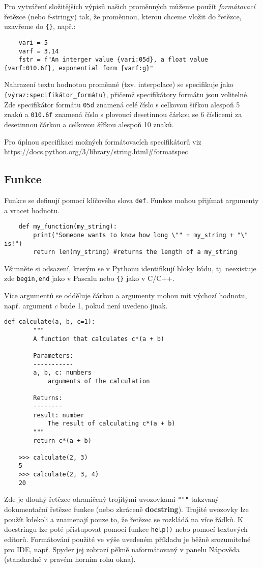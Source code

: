 Pro vytváření složitějších výpisů našich proměnných můžeme použít \emph{formátovací} řetězce (nebo f-stringy) tak, že proměnnou, kterou chceme vložit do řetězce, uzavřeme do \verb|{}|, např.:
\begin{lstlisting}
    vari = 5
    varf = 3.14
    fstr = f"An interger value {vari:05d}, a float value {varf:010.6f}, exponential form {varf:g}"
\end{lstlisting}
Nahrazení textu hodnotou proměnné (tzv. interpolace) se specifikuje jako \verb|{výraz:specifikátor_formátu}|, přičemž specifikátory formátu jsou volitelné. Zde specifikátor formátu \verb|05d| znamená celé číslo s celkovou šířkou alespoň 5 znaků a \verb|010.6f| znamená číslo s plovoucí desetinnou čárkou se 6 číslicemi za desetinnou čárkou a celkovou šířkou alespoň 10 znaků.

Pro úplnou specifikaci možných formátovacích specifikátorů viz \href{dokumentaci}{https://docs.python.org/3/library/string.html\#formatspec}

\subsection{Funkce}
Funkce se definují pomocí klíčového slova \verb|def|. Funkce mohou přijímat argumenty a vracet hodnotu.
\begin{lstlisting}
    def my_function(my_string):
        print("Someone wants to know how long \"" + my_string + "\" is!")
        return len(my_string) #returns the length of a my_string
\end{lstlisting}
Všimněte si odsazení, kterým se v Pythonu identifikují bloky kódu, tj. neexistuje zde \verb|begin,end| jako v Pascalu nebo \verb|{}| jako v C/C++.

Více argumentů se odděluje čárkou a argumenty mohou mít výchozí hodnotu, např. argument $c$ bude 1, pokud není uvedeno jinak.
\begin{lstlisting}[caption=Function definition]
    def calculate(a, b, c=1):
        """
        A function that calculates c*(a + b)

        Parameters:
        -----------
        a, b, c: numbers
            arguments of the calculation

        Returns:
        --------
        result: number
            The result of calculating c*(a + b)
        """
        return c*(a + b)

    >>> calculate(2, 3)
    5
    >>> calculate(2, 3, 4)
    20
\end{lstlisting}
Zde je dlouhý řetězec ohraničený trojitými uvozovkami \lstinline{"""} takzvaný dokumentační řetězec funkce (nebo zkráceně \textbf{docstring}). Trojité uvozovky lze použít kdekoli a znamenají pouze to, že řetězec se rozkládá na více řádků. K docstringu lze poté přistupovat pomocí funkce \lstinline{help()} nebo pomocí textových editorů. Formátování použité ve výše uvedeném příkladu je běžně srozumitelné pro IDE, např. Spyder jej zobrazí pěkně naformátovaný v panelu Nápověda (standardně v pravém horním rohu okna).

